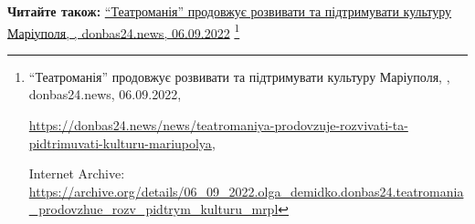  
 
 
 
 

\def\pubIA{https://archive.org/details/06_09_2022.olga_demidko.donbas24.teatromania_prodovzhue_rozv_pidtrym_kulturu_mrpl}
\def\pubTitle{\enquote{Театроманія} продовжує розвивати та підтримувати культуру Маріуполя}
\def\pubDate{06.09.2022}
\def\pubOrigin{https://donbas24.news/news/teatromaniya-prodovzuje-rozvivati-ta-pidtrimuvati-kulturu-mariupolya}
\def\pubAuthor{\pubAuthorDemidko}

\textbf{Читайте також:} \href{\pubIA}{%
\pubTitle, \pubAuthor, donbas24.news, \pubDate}%
\footnote{\pubTitle, \pubAuthor, donbas24.news, \pubDate, \par\url{\pubOrigin}, \par Internet Archive: \url{\pubIA}}
